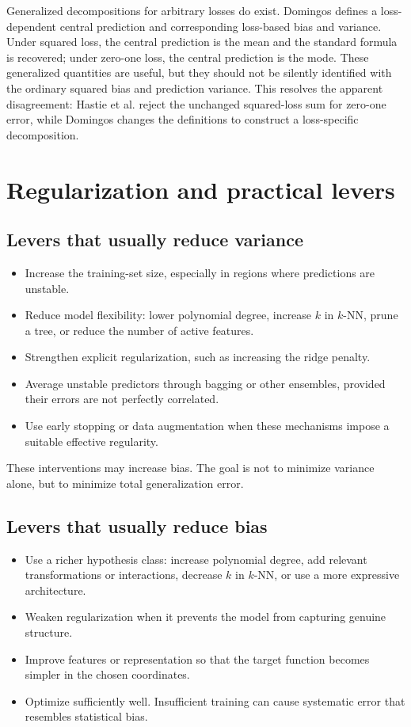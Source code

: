 \documentclass[11pt,a4paper]{article}
\begin{document}
Generalized decompositions for arbitrary losses do exist. Domingos defines a loss-dependent central prediction and corresponding loss-based bias and variance. Under squared loss, the central prediction is the mean and the standard formula is recovered; under zero-one loss, the central prediction is the mode. These generalized quantities are useful, but they should not be silently identified with the ordinary squared bias and prediction variance. This resolves the apparent disagreement: Hastie et al. reject the unchanged squared-loss sum for zero-one error, while Domingos changes the definitions to construct a loss-specific decomposition.

\section{Regularization and practical levers}
\label{sec:levers}

\subsection{Levers that usually reduce variance}

\begin{itemize}
  \item Increase the training-set size, especially in regions where predictions are unstable.
  \item Reduce model flexibility: lower polynomial degree, increase $k$ in $k$-NN, prune a tree, or reduce the number of active features.
  \item Strengthen explicit regularization, such as increasing the ridge penalty.
  \item Average unstable predictors through bagging or other ensembles, provided their errors are not perfectly correlated.
  \item Use early stopping or data augmentation when these mechanisms impose a suitable effective regularity.
\end{itemize}

These interventions may increase bias. The goal is not to minimize variance alone, but to minimize total generalization error.

\subsection{Levers that usually reduce bias}

\begin{itemize}
  \item Use a richer hypothesis class: increase polynomial degree, add relevant transformations or interactions, decrease $k$ in $k$-NN, or use a more expressive architecture.
  \item Weaken regularization when it prevents the model from capturing genuine structure.
  \item Improve features or representation so that the target function becomes simpler in the chosen coordinates.
  \item Optimize sufficiently well. Insufficient training can cause systematic error that resembles statistical bias.
\end{itemize}
\end{document}
